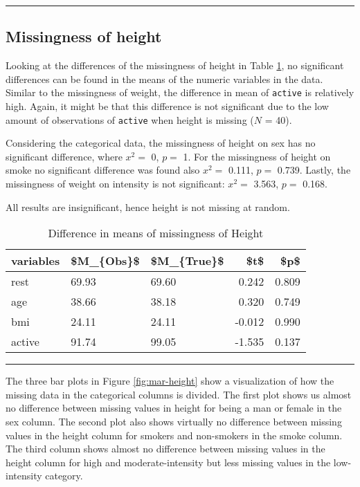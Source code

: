 \documentclass[
]{article}
\begin{document}
\begin{center}\rule{0.5\linewidth}{0.5pt}\end{center}

\hypertarget{missH}{%
\subsection{Missingness of height}\label{missH}}

Looking at the differences of the missingness of height in Table \ref{tab:missH}, no significant differences can be found in the means of the numeric variables in the data. Similar to the missingness of weight, the difference in mean of \texttt{active} is relatively high. Again, it might be that this difference is not significant due to the low amount of observations of \texttt{active} when height is missing (\(N\) = 40).

Considering the categorical data, the missingness of height on sex has no significant difference, where \(x^2 =\) 0, \(p =\) 1. For the missingness of height on smoke no significant difference was found also \(x^2 =\) 0.111, \(p =\) 0.739. Lastly, the missingness of weight on intensity is not significant: \(x^2 =\) 3.563, \(p =\) 0.168.

All results are insignificant, hence height is not missing at random.

\begin{table}

\caption{\label{tab:missH}Difference in means of missingness of Height}
\centering
\begin{tabular}[t]{l|l|l|r|r}
\hline
variables & \$M\_\{Obs\}\$ & \$M\_\{True\}\$ & \$t\$ & \$p\$\\
\hline
rest & 69.93 & 69.60 & 0.242 & 0.809\\
\hline
age & 38.66 & 38.18 & 0.320 & 0.749\\
\hline
bmi & 24.11 & 24.11 & -0.012 & 0.990\\
\hline
active & 91.74 & 99.05 & -1.535 & 0.137\\
\hline
\end{tabular}
\end{table}

\begin{center}\rule{0.5\linewidth}{0.5pt}\end{center}

The three bar plots in Figure \ref{fig:mar-height} show a visualization of how the missing data in the categorical columns is divided. The first plot shows us almost no difference between missing values in height for being a man or female in the sex column. The second plot also shows virtually no difference between missing values in the height column for smokers and non-smokers in the smoke column. The third column shows almost no difference between missing values in the height column for high and moderate-intensity but less missing values in the low-intensity category.
\end{document}
